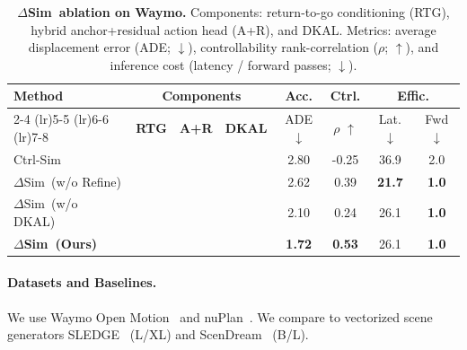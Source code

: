 \documentclass{article}
\newcommand{\cmark}{\textcolor{mydarkgray}{\ding{51}}}
\newcommand{\xmark}{\textcolor{mylightgray}{\ding{55}}}
\newcommand{\best}[1]{\textbf{#1}}
\newcommand{\DeltaSim}{\(\Delta\)Sim}
\theoremstyle{plain}
\theoremstyle{definition}
\theoremstyle{remark}
\begin{document}
\begin{table}[t]
  \centering
  \scriptsize 
  \setlength{\tabcolsep}{2pt} 
    \caption{\textbf{\DeltaSim\ ablation on Waymo.} Components: return-to-go conditioning (RTG), hybrid anchor+residual action head (A+R), and DKAL. Metrics: average displacement error (ADE; \(\downarrow\)), controllability rank-correlation (\(\rho\); \(\uparrow\)), and inference cost (latency / forward passes; \(\downarrow\)).}
  \label{tab:deltasim_main_results_single}
  \begin{tabular}{@{}l ccc c c cc@{}}
    \toprule
    \multirow{2.5}{*}{\textbf{Method}} & 
    \multicolumn{3}{c}{\textbf{Components}} & 
    \textbf{Acc.} & 
    \textbf{Ctrl.} & 
    \multicolumn{2}{c}{\textbf{Effic.}} \\
    
    \cmidrule(lr){2-4} \cmidrule(lr){5-5} \cmidrule(lr){6-6} \cmidrule(lr){7-8}
    
    & \textbf{RTG} 
    & \textbf{A+R} 
    & \textbf{DKAL} 
    & ADE $\downarrow$
    & $\rho$ $\uparrow$
    & Lat. $\downarrow$
    & Fwd $\downarrow$ \\
    
    \midrule
    
    Ctrl-Sim \cite{rowe2024ctrlsim} & \xmark & \xmark & \xmark & 2.80 & -0.25 & 36.9 & 2.0 \\
    
    \midrule
    
    \DeltaSim\ (w/o Refine) & \cmark & \xmark & \cmark & 2.62 & 0.39 & \best{21.7} & \best{1.0} \\
    \DeltaSim\ (w/o DKAL) & \cmark & \cmark & \xmark & 2.10 & 0.24 & 26.1 & \best{1.0} \\
    
    \rowcolor{oursrow}
    \textbf{\DeltaSim\ (Ours)} & \cmark & \cmark & \cmark & \best{1.72} & \best{0.53} & 26.1 & \best{1.0} \\
    
    \bottomrule
  \end{tabular}
\end{table}


\paragraph{Datasets and Baselines.}
We use Waymo Open Motion~\cite{gulino2023waymax} and nuPlan~\cite{caesar2021nuplan}.
We compare to vectorized scene generators SLEDGE~\cite{chitta2024sledge} (L/XL) and ScenDream~\cite{rowe2025scenario} (B/L).
\end{document}
